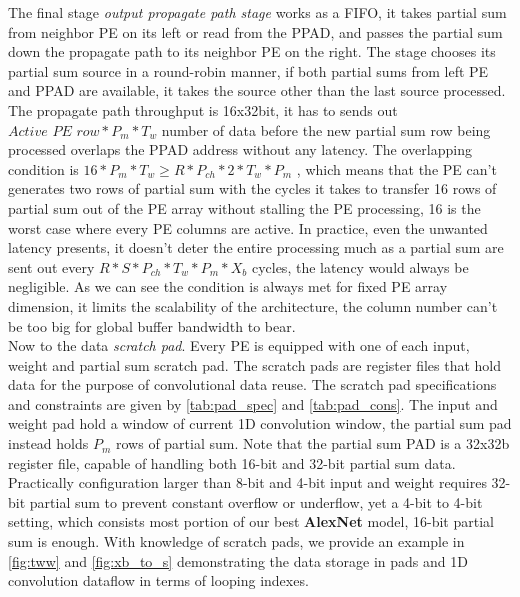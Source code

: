 The final stage \textit{output propagate path stage} works as a FIFO, it takes partial sum from neighbor PE on its left or read from the PPAD, and passes the partial sum down the propagate path to its neighbor PE on the right. The stage chooses its partial sum source in a round-robin manner, if both partial sums from left PE and PPAD are available, it takes the source other than the last source processed. The propagate path throughput is 16x32bit, it has to sends out $\textit{Active PE row}*P_m*T_w$ number of data before the new partial sum row being processed overlaps the PPAD address without any latency. The overlapping condition is $16*P_m*T_w \geq R*P_{ch}*2*T_w*P_m$ , which means that the PE can't generates two rows of partial sum with the cycles it takes to transfer 16 rows of partial sum out of the PE array without stalling the PE processing, 16 is the worst case where every PE columns are active. In practice, even the unwanted latency presents, it doesn't deter the entire processing much as a partial sum are sent out every $R*S*P_{ch}*T_w*P_m*X_b$ cycles, the latency would always be negligible. As we can see the condition is always met for fixed PE array dimension, it limits the scalability of the architecture, the column number can't be too big for global buffer bandwidth to bear. \\
Now to the data \textit{scratch pad}. Every PE is equipped with one of each input, weight and partial sum scratch pad. The scratch pads are register files that hold data for the purpose of convolutional data reuse. The scratch pad specifications and constraints are given by \autoref{tab:pad_spec} and \autoref{tab:pad_cons}. The input and weight pad hold a window of current 1D convolution window, the partial sum pad instead holds $P_m$ rows of partial sum. Note that the partial sum PAD is a 32x32b register file, capable of handling both 16-bit and 32-bit partial sum data. Practically configuration larger than 8-bit and 4-bit input and weight requires 32-bit partial sum to prevent constant overflow or underflow, yet a 4-bit to 4-bit setting, which consists most portion of our best \textbf{AlexNet} model, 16-bit partial sum is enough. With knowledge of scratch pads, we provide an example in \autoref{fig:tww} and \autoref{fig:xb_to_s} demonstrating the data storage in pads and 1D convolution dataflow in terms of looping indexes. \\
